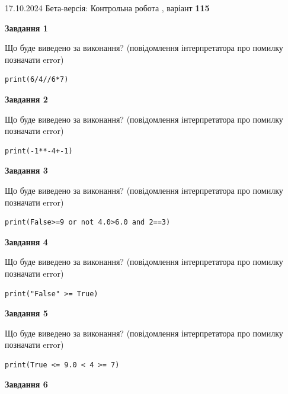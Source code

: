 \documentclass[12pt, ukrainian]{article}
\begin{document}
{\Large{17.10.2024 Бета-версія: Контрольна робота , варіант  \No \textbf { 115 }\par}}
{
\begin {large}
{\begin {center}\textbf{Завдання 1}\end {center}}

Що буде виведено за виконання? (повідомлення інтерпретатора про помилку позначати error)\par
\begin{verbatim}
print(6/4//6*7)
\end{verbatim}

{\begin {center}\textbf{Завдання 2}\end {center}}

Що буде виведено за виконання? (повідомлення інтерпретатора про помилку позначати error)\par
\begin{verbatim}
print(-1**-4+-1)
\end{verbatim}

{\begin {center}\textbf{Завдання 3}\end {center}}

Що буде виведено за виконання? (повідомлення інтерпретатора про помилку позначати error)\par
\begin{verbatim}
print(False>=9 or not 4.0>6.0 and 2==3)
\end{verbatim}

{\begin {center}\textbf{Завдання 4}\end {center}}

Що буде виведено за виконання? (повідомлення інтерпретатора про помилку позначати error)\par
\begin{verbatim}
print("False" >= True)
\end{verbatim}

{\begin {center}\textbf{Завдання 5}\end {center}}

Що буде виведено за виконання? (повідомлення інтерпретатора про помилку позначати error)\par
\begin{verbatim}
print(True <= 9.0 < 4 >= 7)
\end{verbatim}

{\begin {center}\textbf{Завдання 6}\end {center}}


\end{large}}
\end{document}
